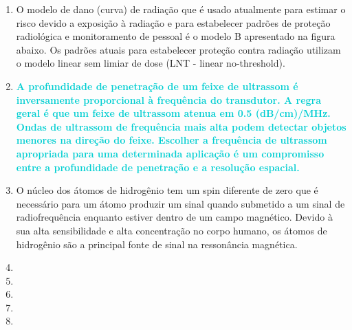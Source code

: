 \documentclass[11pt,a4paper]{article}
\begin{document}
\begin{enumerate}
        \item O modelo de dano (curva) de radiação que é usado atualmente para estimar o risco devido a exposição à radiação e para estabelecer padrões de proteção radiológica e monitoramento de pessoal é o modelo B apresentado na figura abaixo. Os padrões atuais para estabelecer proteção contra radiação utilizam o modelo linear sem limiar de dose (LNT - linear no-threshold).
        
        \begin{center}
        \end{center}

        \item \textcolor{DarkTurquoise}{\textbf{A profundidade de penetração de um feixe de ultrassom é inversamente proporcional à frequência do transdutor. A regra geral é que um feixe de ultrassom atenua em 0.5 (dB/cm)/MHz. Ondas de ultrassom de frequência mais alta podem detectar objetos menores na direção do feixe. Escolher a frequência de ultrassom apropriada para uma determinada aplicação é um compromisso entre a profundidade de penetração e a resolução espacial.}}

        \item O núcleo dos átomos de hidrogênio tem um spin diferente de zero que é necessário para um átomo produzir um sinal quando submetido a um sinal de radiofrequência enquanto estiver dentro de um campo magnético. Devido à sua alta sensibilidade e alta concentração no corpo humano, os átomos de hidrogênio são a principal fonte de sinal na ressonância magnética.

        \item

        \item

        \item

        \item

        \item


\end{enumerate}
\end{document}
